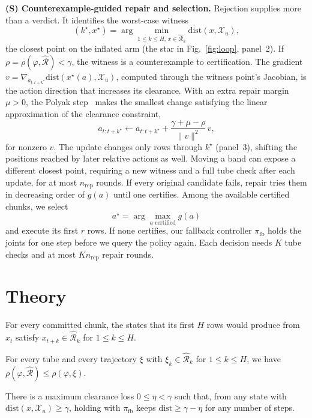 \documentclass[runningheads]{llncs}
\newcommand{\Rh}{\hat{\mathcal{R}}}
\newcommand{\Xu}{\mathcal{X}_u}
\begin{document}
\textbf{(S) Counterexample-guided repair and selection.} Rejection supplies
more than a verdict. It identifies the worst-case witness
\begin{equation}
(k^\star, x^\star) = \arg\min_{1 \le k \le H,\, x \in \Rh_k} \mathrm{dist}(x, \Xu),
\label{eq:ce}
\end{equation}
the closest point on the inflated arm (the star in Fig.~\ref{fig:loop},
panel~2). If $\rho=\rho(\varphi,\Rh)<\gamma$, the witness is a
counterexample to certification. The gradient
$v=\nabla_{a_{t:t+k^\star}}\mathrm{dist}(x^\star(a),\Xu)$, computed through
the witness point's Jacobian, is the action direction that increases its
clearance. With an extra repair margin $\mu>0$, the Polyak
step~\cite{polyak1969minimization} makes the smallest change satisfying the
linear approximation of the clearance constraint,
\begin{equation}
a_{t:t+k^\star} \leftarrow a_{t:t+k^\star} + \frac{\gamma + \mu - \rho}{\|v\|^2}\, v,
\label{eq:repair}
\end{equation}
for nonzero $v$. The update changes only rows through $k^\star$ (panel~3),
shifting the positions reached by later relative actions as well.
Moving a band can expose a different closest point, requiring a new
witness and a full tube check after each update, for at most
$n_{\mathrm{rep}}$ rounds. If every original candidate fails, repair tries
them in decreasing order of $g(a)$ until one certifies.
Among the available certified chunks, we select
\begin{equation}
a^\star = \arg\max_{a \text{ certified}} g(a)
\label{eq:select}
\end{equation}
and execute its first $r$ rows. If none certifies, our fallback controller
$\pi_{\mathrm{fb}}$ holds the joints for one step before we query the policy
again. Each decision needs $K$ tube checks and at most $K n_{\mathrm{rep}}$
repair rounds.

\section{Theory}\label{sec:theory}

\begin{assumption}\label{as:tube}
For every committed chunk, the states that its first $H$ rows would produce
from $x_t$ satisfy $x_{t+k} \in \Rh_k$ for $1 \le k \le H$.
\end{assumption}
\begin{assumption}\label{as:stl}
For every tube and every trajectory $\xi$ with $\xi_k \in \Rh_k$ for
$1 \le k \le H$, we have $\rho(\varphi, \Rh) \le \rho(\varphi, \xi)$.
\end{assumption}
\begin{assumption}\label{as:fb}
There is a maximum clearance loss $0\le\eta < \gamma$ such that, from any state with
$\mathrm{dist}(x,\Xu) \ge \gamma$, holding with $\pi_{\mathrm{fb}}$ keeps
$\mathrm{dist} \ge \gamma - \eta$ for any number of steps.
\end{assumption}
\end{document}
